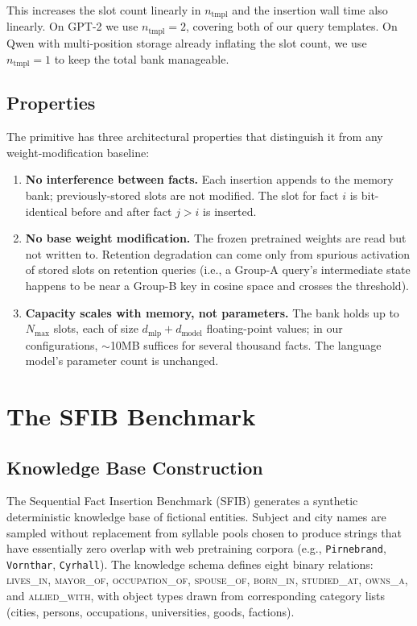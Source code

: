 \documentclass[11pt,a4paper]{article}
\begin{document}
This increases the slot count linearly in $n_\text{tmpl}$ and the
insertion wall time also linearly. On GPT-2 we use $n_\text{tmpl} = 2$,
covering both of our query templates. On Qwen with multi-position storage
already inflating the slot count, we use $n_\text{tmpl} = 1$ to keep the
total bank manageable.

\subsection{Properties}

The primitive has three architectural properties that distinguish it
from any weight-modification baseline:
\begin{enumerate}[leftmargin=*,topsep=2pt,itemsep=2pt]
\item \textbf{No interference between facts.} Each insertion appends to
the memory bank; previously-stored slots are not modified. The slot for
fact $i$ is bit-identical before and after fact $j > i$ is inserted.
\item \textbf{No base weight modification.} The frozen pretrained weights
are read but not written to. Retention degradation can come only from
spurious activation of stored slots on retention queries (i.e., a
Group-A query's intermediate state happens to be near a Group-B key
in cosine space and crosses the threshold).
\item \textbf{Capacity scales with memory, not parameters.} The bank
holds up to $N_\text{max}$ slots, each of size
$d_\text{mlp} + d_\text{model}$ floating-point values; in our
configurations, $\sim$10MB suffices for several thousand facts. The
language model's parameter count is unchanged.
\end{enumerate}

\section{The SFIB Benchmark}

\subsection{Knowledge Base Construction}

The Sequential Fact Insertion Benchmark (SFIB) generates a synthetic
deterministic knowledge base of fictional entities. Subject and city
names are sampled without replacement from syllable pools chosen to
produce strings that have essentially zero overlap with web pretraining
corpora (e.g., \texttt{Pirnebrand}, \texttt{Vornthar}, \texttt{Cyrhall}).
The knowledge schema defines eight binary relations:
\textsc{lives\_in}, \textsc{mayor\_of}, \textsc{occupation\_of},
\textsc{spouse\_of}, \textsc{born\_in}, \textsc{studied\_at},
\textsc{owns\_a}, and \textsc{allied\_with}, with object types drawn
from corresponding category lists (cities, persons, occupations,
universities, goods, factions).
\end{document}
